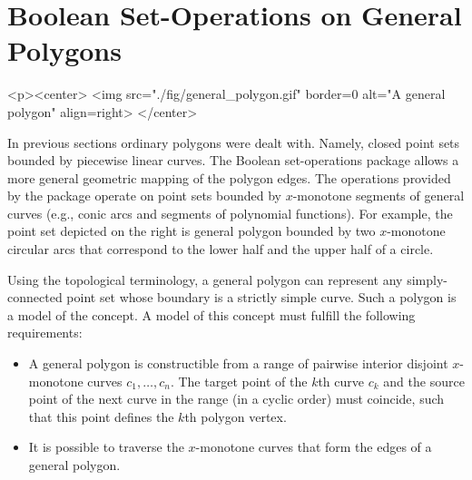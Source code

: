 \section{Boolean Set-Operations on General Polygons\label{bso_sec:bso_gen}}

\lcTex{%
  \setlength{\BooleanSetOpsWidthRight}{1.4cm}
  \setlength{\BooleanSetOpsWidthLeft}{\BooleanSetOpsWidthLineReal}
  \addtolength{\BooleanSetOpsWidthLeft}{-\BooleanSetOpsWidthRight}
  \begin{minipage}{\BooleanSetOpsWidthLeft}
}
\label{fig:general_polygon}
\begin{ccHtmlOnly}
  <p><center>
    <img src="./fig/general_polygon.gif" border=0 alt="A general polygon" align=right>
  </center>
\end{ccHtmlOnly}
In previous sections ordinary polygons were dealt with. Namely, closed
point sets bounded by piecewise linear curves. The Boolean
set-operations package allows a more general geometric mapping of the
polygon edges. The operations provided by the package operate on point
sets bounded by $x$-monotone segments of general curves (e.g., conic
arcs and segments of polynomial functions). For example, the point set
depicted on the right is general polygon bounded by two $x$-monotone
circular arcs that correspond to the lower half and the upper half of
a circle.

Using the topological terminology, a general polygon can represent any
simply-connected point set whose boundary is a strictly simple curve.
Such a polygon is a model of the  concept. A model
of this concept must fulfill the following requirements:
\begin{itemize}
\item A general polygon is constructible from a range of pairwise
interior disjoint $x$-monotone curves $c_1, \ldots, c_n$. The target
point of the $k$th curve $c_k$ and the source point of the next curve
in the range (in a cyclic order) must coincide, such that this point
defines the $k$th polygon vertex. 
\item It is possible to traverse the $x$-monotone curves that form the
edges of a general polygon.
\end{itemize}

